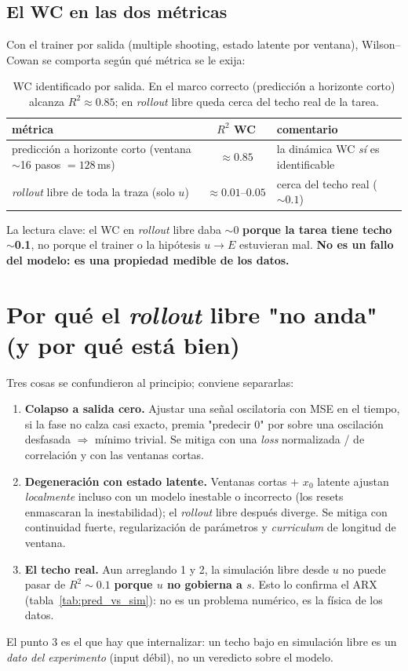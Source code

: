 \documentclass[11pt,a4paper]{article}
\begin{document}
\subsection*{El WC en las dos métricas}
Con el trainer por salida (multiple shooting, estado latente por ventana), Wilson--Cowan se comporta según qué métrica se le exija:

\begin{table}[H]
\centering
\small
\begin{tabular}{@{}lcl@{}}
\toprule
métrica & $R^2$ WC & comentario \\
\midrule
predicción a horizonte corto (ventana $\sim$16 pasos $=128$\,ms) & $\mathbf{\approx 0.85}$ & la dinámica WC \emph{sí} es identificable \\
\emph{rollout} libre de toda la traza (solo $u$) & $\approx 0.01\text{--}0.05$ & cerca del techo real ($\sim0.1$) \\
\bottomrule
\end{tabular}
\caption{WC identificado por salida. En el marco correcto (predicción a horizonte corto) alcanza $R^2\approx0.85$; en \emph{rollout} libre queda cerca del techo real de la tarea.}
\label{tab:wc}
\end{table}

La lectura clave: el WC en \emph{rollout} libre daba $\sim$0 \textbf{porque la tarea tiene techo $\sim$0.1}, no porque el trainer o la hipótesis $u\to E$ estuvieran mal. \textbf{No es un fallo del modelo: es una propiedad medible de los datos.}

\section{Por qué el \emph{rollout} libre "no anda" (y por qué está bien)}
Tres cosas se confundieron al principio; conviene separarlas:
\begin{enumerate}[leftmargin=1.6em]
  \item \textbf{Colapso a salida cero.} Ajustar una señal oscilatoria con MSE en el tiempo, si la fase no calza casi exacto, premia "predecir 0" por sobre una oscilación desfasada $\Rightarrow$ mínimo trivial. Se mitiga con una \emph{loss} normalizada / de correlación y con las ventanas cortas.
  \item \textbf{Degeneración con estado latente.} Ventanas cortas $+$ $x_0$ latente ajustan \emph{localmente} incluso con un modelo inestable o incorrecto (los resets enmascaran la inestabilidad); el \emph{rollout} libre después diverge. Se mitiga con continuidad fuerte, regularización de parámetros y \emph{curriculum} de longitud de ventana.
  \item \textbf{El techo real.} Aun arreglando 1 y 2, la simulación libre desde $u$ no puede pasar de $R^2\sim0.1$ \textbf{porque $u$ no gobierna a $s$}. Esto lo confirma el ARX (tabla~\ref{tab:pred_vs_sim}): no es un problema numérico, es la física de los datos.
\end{enumerate}
El punto 3 es el que hay que internalizar: un techo bajo en simulación libre es un \emph{dato del experimento} (input débil), no un veredicto sobre el modelo.
\end{document}

